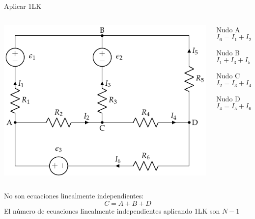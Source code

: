 \documentclass[aspectratio=169, xcolor={usenames,svgnames,dvipsnames}]{beamer}
\begin{document}
\begin{frame}{Aplicar 1LK}
\begin{columns}
\begin{column}{0.5\columnwidth}
\begin{center}
\includegraphics[width=.9\linewidth]{../figs/mallas1.pdf}
\end{center}
\end{column}

\begin{column}{0.5\columnwidth}
Nudo A
\begin{equation*}
  I_6 = I_1 + I_2
\end{equation*}

Nudo B
\begin{equation*}
  I_1 + I_3 + I_5 = 0
\end{equation*}

Nudo C
\begin{equation*}
  I_2 = I_3 + I_4
\end{equation*}

Nudo D
\begin{equation*}
  I_4 = I_5 + I_6
\end{equation*}
\end{column}
\end{columns}

\vspace{5pt}


No son ecuaciones linealmente independientes:
\begin{equation*}
  C = A + B + D
\end{equation*}
\alert{El número de ecuaciones linealmente independientes aplicando 1LK son $N-1$}
\end{frame}
\end{document}
